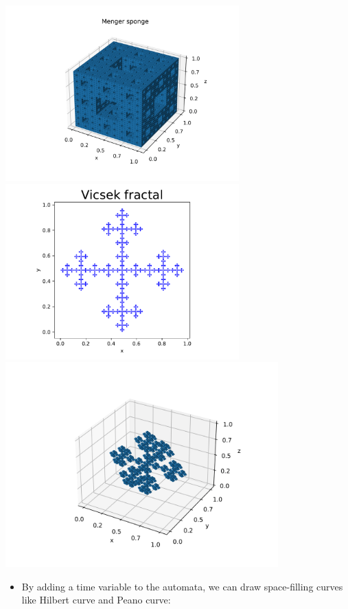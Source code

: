 \documentclass[landscape,usenames,dvipsnames]{sciposter}
\begin{document}
\begin{multicols}{3}
\begin{center}
    \includegraphics[width=9cm]{FA20/images/fractals/menger-3-l4-min.png}
    \includegraphics[width=9cm]{FA20/images/fractals/vicsek-l5.pdf}
    \includegraphics[width=10.5cm]{FA20/images/fractals/vicsek-3d-l4-min.png}
\end{center}
    
\begin{itemize}
        \item By adding a time variable to the automata, we can draw space-filling curves like Hilbert curve and Peano curve:
\end{itemize}
    

\end{multicols}
\end{document}
